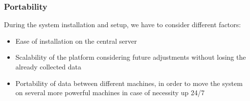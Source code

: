 \subsubsection{Portability}
During the system installation and setup, we have to consider different factors:

\begin{itemize}
	\item Ease of installation on the central server
	\item Scalability of the platform considering future adjustments without losing the already collected data
	\item Portability of data between different machines, in order to move the system on several more powerful machines in case of necessity
	up 24/7
\end{itemize}
